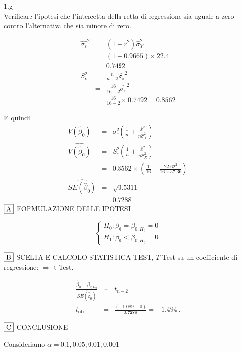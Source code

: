 \documentclass[
  11pt,
]{book}
\theoremstyle{mytheoremstyle}
\theoremstyle{mydefstyle}
\newenvironment{sol}
  {
  \begin{tcolorbox}[enhanced,breakable,arc=0.1mm,boxrule=1pt,colback=white,colframe=iblue,
  title=\bf \fontfamily{lmss}\selectfont \hspace{.5 cm} Soluzione,drop fuzzy shadow]

}{
\end{tcolorbox}
  }
\begin{document}
1.g\\
Verificare l'ipotesi che l'intercetta della retta di
regressione sia uguale a zero contro l'alternativa che sia
minore di zero.

\begin{sol}
\begin{eqnarray*}
\hat{\sigma_\varepsilon}^2&=&(1-r^2)\hat\sigma_Y^2\\
&=& (1- 0.9665 )\times 22.4 \\
   &=&  0.7492 \\
   S_\varepsilon^2 &=& \frac{n} {n-2} \hat{\sigma_\varepsilon}^2\\
   &=&  \frac{ 16 } { 16 -2} \hat{\sigma_\varepsilon}^2 \\
 &=&  \frac{ 16 } { 16 -2} \times  0.7492  =  0.8562  
\end{eqnarray*}

E quindi\begin{eqnarray*}
V(\hat\beta_{0}) &=& \sigma_{\varepsilon}^{2} \left( \frac{1} {n}  +  \frac{\bar{x}^{2}} {n \hat{\sigma}^{2}_{X}} \right)\\
\widehat{V(\hat\beta_{0})} &=& S_{\varepsilon}^{2}\left( \frac{1} {n}  +  \frac{\bar{x}^{2}} {n \hat{\sigma}^{2}_{X}} \right)\ \\
 &=&  0.8562 \times\left( \frac{1} { 16 }  +  \frac{ 22.62 ^{2}} { 16 \times  57.36 } \right)\\
 \widehat{SE(\hat\beta_{0})}        &=&  \sqrt{ 0.5311 }\\
 &=&  0.7288 
\end{eqnarray*}
\(\fbox{A}\) FORMULAZIONE DELLE IPOTESI

\[\begin{cases}
   H_0: \beta_0 = \beta_{0;H_0}=0 \\
   H_1: \beta_0 < \beta_{0;H_0}=0 
   \end{cases}\]

\(\fbox{B}\) SCELTA E CALCOLO STATISTICA-TEST, \(T\)
Test su un coefficiente di regressione: \(\Rightarrow\) t-Test.

\begin{eqnarray*}
 \frac{\hat\beta_{ 0 } - \beta_{ 0 ;H_0}} {\widehat{SE(\hat\beta_{ 0 })}}&\sim&t_{n-2}\\
   t_{\text{obs}}
&=& \frac{ ( -1.089 -  0 )} { 0.7288 }
 =   -1.494 \, .
\end{eqnarray*}

\(\fbox{C}\) CONCLUSIONE

Consideriamo \(\alpha=0.1, 0.05, 0.01, 0.001\)


\end{sol}
\end{document}
